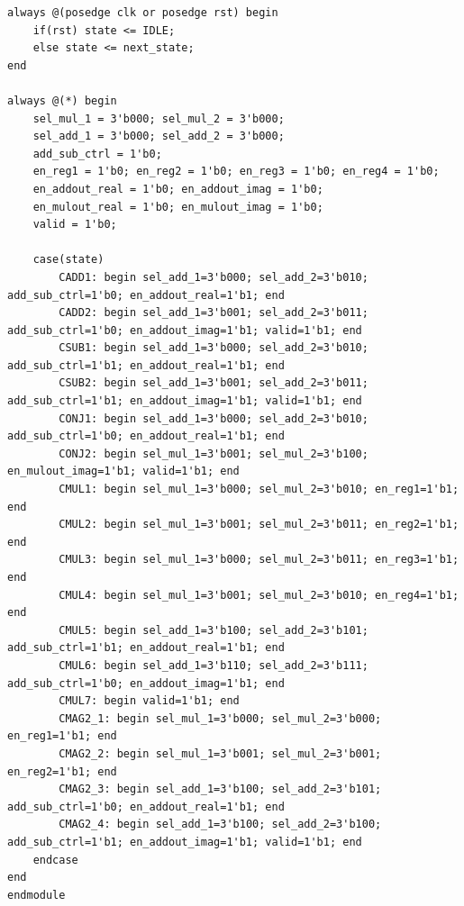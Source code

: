 \documentclass[11pt,a4paper]{article}
\begin{document}
\begin{LTR}
\begin{lstlisting}[title={\rl{کد پیمانه واحد کنترل}}]
always @(posedge clk or posedge rst) begin
    if(rst) state <= IDLE;
    else state <= next_state;
end

always @(*) begin
    sel_mul_1 = 3'b000; sel_mul_2 = 3'b000;
    sel_add_1 = 3'b000; sel_add_2 = 3'b000;
    add_sub_ctrl = 1'b0;
    en_reg1 = 1'b0; en_reg2 = 1'b0; en_reg3 = 1'b0; en_reg4 = 1'b0;
    en_addout_real = 1'b0; en_addout_imag = 1'b0;
    en_mulout_real = 1'b0; en_mulout_imag = 1'b0;
    valid = 1'b0;

    case(state)
        CADD1: begin sel_add_1=3'b000; sel_add_2=3'b010; add_sub_ctrl=1'b0; en_addout_real=1'b1; end
        CADD2: begin sel_add_1=3'b001; sel_add_2=3'b011; add_sub_ctrl=1'b0; en_addout_imag=1'b1; valid=1'b1; end
        CSUB1: begin sel_add_1=3'b000; sel_add_2=3'b010; add_sub_ctrl=1'b1; en_addout_real=1'b1; end
        CSUB2: begin sel_add_1=3'b001; sel_add_2=3'b011; add_sub_ctrl=1'b1; en_addout_imag=1'b1; valid=1'b1; end
        CONJ1: begin sel_add_1=3'b000; sel_add_2=3'b010; add_sub_ctrl=1'b0; en_addout_real=1'b1; end
        CONJ2: begin sel_mul_1=3'b001; sel_mul_2=3'b100; en_mulout_imag=1'b1; valid=1'b1; end
        CMUL1: begin sel_mul_1=3'b000; sel_mul_2=3'b010; en_reg1=1'b1; end
        CMUL2: begin sel_mul_1=3'b001; sel_mul_2=3'b011; en_reg2=1'b1; end
        CMUL3: begin sel_mul_1=3'b000; sel_mul_2=3'b011; en_reg3=1'b1; end
        CMUL4: begin sel_mul_1=3'b001; sel_mul_2=3'b010; en_reg4=1'b1; end
        CMUL5: begin sel_add_1=3'b100; sel_add_2=3'b101; add_sub_ctrl=1'b1; en_addout_real=1'b1; end
        CMUL6: begin sel_add_1=3'b110; sel_add_2=3'b111; add_sub_ctrl=1'b0; en_addout_imag=1'b1; end
        CMUL7: begin valid=1'b1; end
        CMAG2_1: begin sel_mul_1=3'b000; sel_mul_2=3'b000; en_reg1=1'b1; end
        CMAG2_2: begin sel_mul_1=3'b001; sel_mul_2=3'b001; en_reg2=1'b1; end
        CMAG2_3: begin sel_add_1=3'b100; sel_add_2=3'b101; add_sub_ctrl=1'b0; en_addout_real=1'b1; end
        CMAG2_4: begin sel_add_1=3'b100; sel_add_2=3'b100; add_sub_ctrl=1'b1; en_addout_imag=1'b1; valid=1'b1; end
    endcase
end
endmodule
\end{lstlisting}
\end{LTR}
\end{document}
